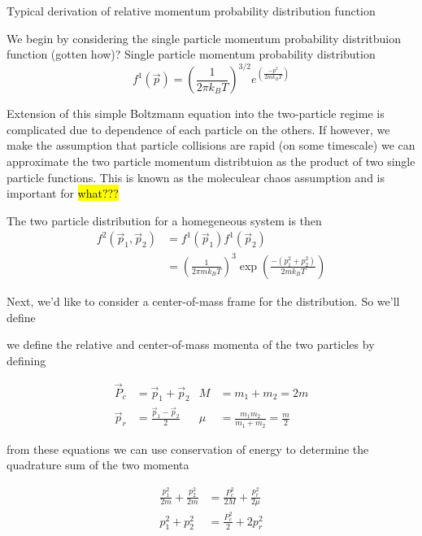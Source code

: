 Typical derivation of relative momentum probability distribution function

We begin by considering the single particle momentum probability distritbuion function (gotten how)? 
Single particle momentum probability distribution
\begin{equation} 
\label{eq:single_particle_prob}
		 f^1( \vec{p} ) = \left(\frac{1}{2 \pi k_B T}\right)^{3/2} e^{\left(\frac{-p^2}{2 m k_B T}\right)}
\end{equation}

\noindent
Extension of this simple Boltzmann equation into the two-particle regime is complicated due to dependence of each particle on the others. If however, we make the assumption that particle collisions are rapid (on some timescale) we can approximate the two particle momentum distribtuion as the product of two single particle functions. This is known as the moleculear chaos assumption and is important for \hl{what???}

The two particle distribution for a homegeneous system is then
\begin{equation}
\label{eq:two_particle_prob}
\begin{split}
		 f^2( \vec{p}_1, \vec{p}_2 ) &= f^1( \vec{p}_1 ) f^1( \vec{p}_2 ) \\
		  &= \left(\frac{1}{2 \pi m k_B T}\right)^3 \exp\left(\frac{-(p_1^2 + p_2^2)}{2 m k_B T}\right)
\end{split}
\end{equation}

Next, we'd like to consider a center-of-mass frame for the distribution. So we'll define

 we define the relative and center-of-mass momenta of the two particles by defining

\begin{align*}
	\vec{P}_c & = \vec{p}_1 + \vec{p}_2             &	M   &= m_1 + m_2 = 2m \\
	\vec{p}_r & = \frac{\vec{p}_1 - \vec{p}_2}{2}   &   \mu &= \frac{m_1 m_2}{m_1 + m_2} = \frac{m}{2}
\end{align*}

from these equations we can use conservation of energy to determine the quadrature sum of the two momenta

\begin{align*}
	\frac{p_1^2}{2m} + \frac{p_2^2}{2m} &= \frac{P_c^2}{2M} + \frac{p_r^2}{2\mu} \\
	p_1^2 + p_2^2 &= \frac{P_c^2}{2} + 2 p_r^2
\end{align*}

